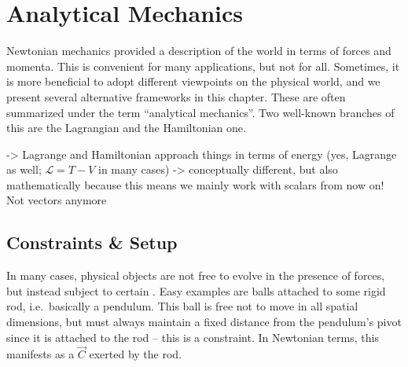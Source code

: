 \documentclass[../class_mech_main.tex]{subfiles}
\begin{document}
\chapter{Analytical Mechanics}

Newtonian mechanics provided a description of the world in terms of forces and momenta. This is convenient for many applications, but not for all. Sometimes, it is more beneficial to adopt different viewpoints on the physical world, and we present several alternative frameworks in this chapter. These are often summarized under the term \enquote{analytical mechanics}. Two well-known branches of this are the Lagrangian and the Hamiltonian one.




-> Lagrange and Hamiltonian approach things in terms of energy (yes, Lagrange as well; $\mathcal{L} = T - V$ in many cases) -> conceptually different, but also mathematically because this means we mainly work with scalars from now on! Not vectors anymore



	\section{Constraints \& Setup}
In many cases, physical objects are not free to evolve in the presence of forces, but instead subject to certain . Easy examples are balls attached to some rigid rod, i.e.~basically a pendulum. This ball is free not to move in all spatial dimensions, but must always maintain a fixed distance from the pendulum's pivot since it is attached to the rod -- this is a constraint. In Newtonian terms, this manifests as a  $\vec{C}$ exerted by the rod.
\end{document}

